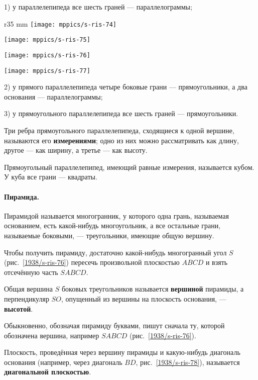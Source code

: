 1) у параллелепипеда все шесть граней — параллелограммы;

\begin{wrapfigure}[39]{r}{35 mm}
\vskip-0mm
\centering
\texttt{[image: mppics/s-ris-74]}
\caption{}\label{1938/s-ris-74}
\bigskip
\texttt{[image: mppics/s-ris-75]}
\caption{}\label{1938/s-ris-75}
\bigskip
\texttt{[image: mppics/s-ris-76]}
\caption{}\label{1938/s-ris-76}
\bigskip
\texttt{[image: mppics/s-ris-77]}
\caption{}\label{1938/s-ris-77}
\end{wrapfigure}

2) у прямого параллелепипеда четыре боковые грани — прямоугольники, а два основания — параллелограммы;

3) у прямоугольного параллелепипеда все шесть граней — прямоугольники.

Три ребра прямоугольного параллелепипеда, сходящиеся к одной вершине, называются его \textbf{измерениями};
одно из них можно рассматривать как длину, другое — как ширину, а третье — как высоту.

Прямоугольный параллелепипед, имеющий равные измерения, называется кубом.
У куба все грани — квадраты.

\paragraph{Пирамида.}\label{1938/s70}
Пирамидой называется многогранник, у которого одна грань, называемая основанием, есть какой-нибудь многоугольник, а все остальные грани, называемые боковыми, — треугольники, имеющие общую вершину.

Чтобы получить пирамиду, достаточно какой-нибудь многогранный угол $S$ (рис.~\ref{1938/s-ris-76}) пересечь произвольной плоскостью $ABCD$ и взять отсечённую часть $SABCD$.

Общая вершина $S$ боковых треугольников называется \textbf{вершиной} пирамиды, а перпендикуляр $SO$, опущенный из вершины на плоскость основания, — \textbf{высотой}.

Обыкновенно, обозначая пирамиду буквами, пишут сначала ту, которой обозначена вершина, например $SABCD$ (рис.~\ref{1938/s-ris-76}).



Плоскость, проведённая через вершину пирамиды и какую-нибудь диагональ основания (например, через диагональ $BD$, рис.~\ref{1938/s-ris-78}), называется {}\textbf{диагональной плоскостью}.

